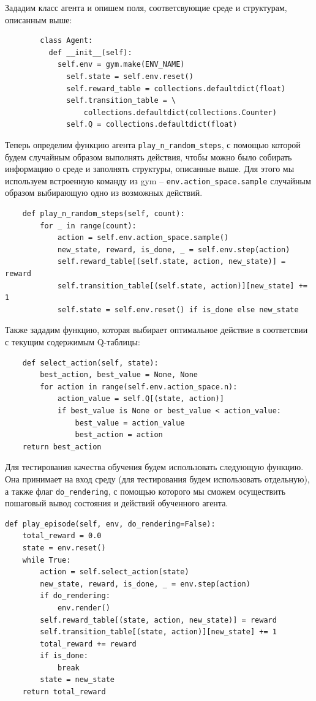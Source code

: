\documentclass[fleqn, a4paper, 14pt]{article}
\begin{document}
	Зададим класс агента и опишем поля, соответсвующие среде и структурам, описанным выше:
	\begin{lstlisting}	
		class Agent:
		  def __init__(self):
		    self.env = gym.make(ENV_NAME)
		      self.state = self.env.reset()
		      self.reward_table = collections.defaultdict(float)
		      self.transition_table = \
			      collections.defaultdict(collections.Counter)  
		      self.Q = collections.defaultdict(float)
	\end{lstlisting}
	
	Теперь определим функцию агента \verb|play_n_random_steps|, с помощью которой будем случайным образом выполнять действия, чтобы можно было собирать информацию о среде и заполнять структуры, описанные выше. Для этого мы используем встроенную команду из gym -- \verb|env.action_space.sample| случайным образом выбирающую одно из возможных действий.
		

	\begin{lstlisting}	
    def play_n_random_steps(self, count):
	    for _ in range(count):
		    action = self.env.action_space.sample()
		    new_state, reward, is_done, _ = self.env.step(action)
		    self.reward_table[(self.state, action, new_state)] = reward
		    self.transition_table[(self.state, action)][new_state] += 1
		    self.state = self.env.reset() if is_done else new_state
	\end{lstlisting}
	
	Также зададим функцию, которая выбирает оптимальное действие в соответсвии с текущим содержимым Q-таблицы:
	
	\begin{lstlisting}	
    def select_action(self, state):
	    best_action, best_value = None, None
	    for action in range(self.env.action_space.n):
		    action_value = self.Q[(state, action)]
		    if best_value is None or best_value < action_value:
			    best_value = action_value
			    best_action = action
    return best_action
	\end{lstlisting}
	
	Для тестирования качества обучения будем использовать следующую функцию. Она принимает на вход среду (для тестирования будем использовать отдельную), а также флаг \verb|do_rendering|, с помощью которого мы сможем осуществить пошаговый вывод состояния и действий обученного агента. 
	\begin{lstlisting}
def play_episode(self, env, do_rendering=False):
    total_reward = 0.0
    state = env.reset()
    while True:
	    action = self.select_action(state)
	    new_state, reward, is_done, _ = env.step(action)
	    if do_rendering:
		    env.render()
	    self.reward_table[(state, action, new_state)] = reward
	    self.transition_table[(state, action)][new_state] += 1
	    total_reward += reward
	    if is_done:
		    break
	    state = new_state
    return total_reward
	\end{lstlisting}
	
\end{document}
